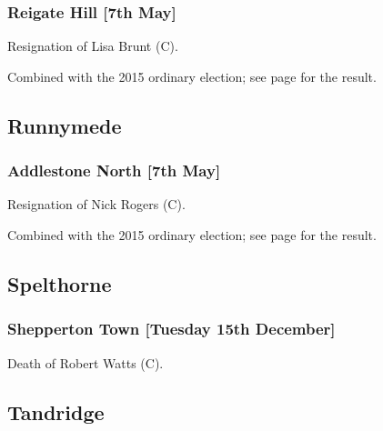 \documentclass[a4paper,openany]{book}
\begin{document}
\begin{resultsiii}
\subsubsection*{Reigate Hill \hspace*{\fill}\nolinebreak[1]%
\enspace\hspace*{\fill}
[7th May]}


Resignation of Lisa Brunt (C).

Combined with the 2015 ordinary election; see page \pageref{ReigateHillReigateBanstead} for the result.

\subsection*{Runnymede}

\subsubsection*{Addlestone North \hspace*{\fill}\nolinebreak[1]%
\enspace\hspace*{\fill}
[7th May]}


Resignation of Nick Rogers (C).

Combined with the 2015 ordinary election; see page \pageref{AddlestoneNorthRunnymede} for the result.

\subsection*{Spelthorne}

\subsubsection*{Shepperton Town \hspace*{\fill}\nolinebreak[1]%
\enspace\hspace*{\fill}
[Tuesday 15th December]}


Death of Robert Watts (C).

\subsection*{Tandridge}


\end{resultsiii}
\end{document}
